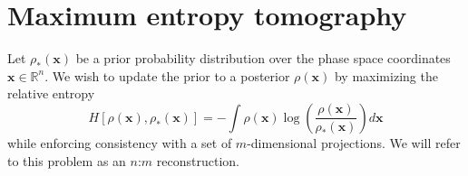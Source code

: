 \documentclass[%
    reprint,
    twocolumn,
    nofootinbib,
    amsmath,
    amssymb,
    aps,
    prstab,
]{revtex4-2}
\newcommand{\vect}[1]{\boldsymbol{\mathbf{#1}}}
\begin{document}
\section{Maximum entropy tomography} \label{sec:ment}

Let $\rho_*(\vect{x})$ be a prior probability distribution over the phase space coordinates $\vect{x} \in \mathbb{R}^n$. We wish to update the prior to a posterior $\rho(\vect{x})$ by maximizing the relative entropy
%
\begin{equation}\label{eq:entropy}
    H[\rho(\vect{x}), \rho_*(\vect{x})] =
    -\int{
        \rho(\vect{x}) 
        \log{ 
            \left( \frac{\rho(\vect{x})}{\rho_*(\vect{x})} \right)
        } 
        d\vect{x}
    }
\end{equation}
%
while enforcing consistency with a set of $m$-dimensional projections. We will refer to this problem as an $n$:$m$ reconstruction. 
\end{document}
